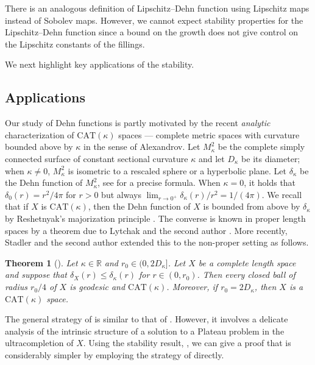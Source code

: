 \documentclass[a4paper,leqno]{amsart}
\numberwithin{equation}{section}
\newtheorem{theorem}{Theorem}[section]
\theoremstyle{remark}
\theoremstyle{remark}
\begin{document}
There is an analogous definition of Lipschitz--Dehn function using Lipschitz maps instead of Sobolev maps. However, we cannot expect stability properties for the Lipschitz--Dehn function since a bound on the growth does not give control on the Lipschitz constants of the fillings.%

We next highlight key applications of the stability.




\subsection{Applications}
Our study of Dehn functions is partly motivated by the recent \emph{analytic} characterization of $\mathrm{CAT}(\kappa)$ spaces --- complete metric spaces with curvature bounded above by $\kappa$ in the sense of Alexandrov. Let $M^{2}_\kappa$ be the complete simply connected surface of constant sectional curvature $\kappa$ and let $D_\kappa$ be its diameter; when $\kappa \neq 0$, $M^{2}_\kappa$ is isometric to a rescaled sphere or a hyperbolic plane. Let $\delta_\kappa$ be the Dehn function of $M^{2}_\kappa$, see \cite[Section 4.1]{stadler-wenger-2025-isoperimetric-inequalities-vs-upper-curvature-bounds} for a precise formula. When $\kappa = 0$, it holds that $\delta_{0}(r) = r^2/4\pi$ for $r > 0$ but always $\lim_{ r \to 0^{+} }\delta_{\kappa}(r)/r^2 = 1/(4\pi)$. We recall that if $X$ is $\mathrm{CAT}(\kappa)$, then the Dehn function of $X$ is bounded from above by $\delta_\kappa$ by Reshetnyak's majorization principle \cite{reshetnyak-1968-non-expansive-maps-in-a-space-of-curvature-no-greater-than-K}. The converse is known in proper length spaces by a theorem due to Lytchak and the second author \cite{Lyt:Wen:18:CAT}. More recently, Stadler and the second author \cite{stadler-wenger-2025-isoperimetric-inequalities-vs-upper-curvature-bounds} extended this to the non-proper setting as follows.
\begin{theorem}[{\cite[Theorem A]{stadler-wenger-2025-isoperimetric-inequalities-vs-upper-curvature-bounds}}]\label{theorem-local-cat(kappa)}
Let $\kappa \in \mathbb{R}$ and $r_0 \in (0, 2D_\kappa]$. Let $X$ be a complete length space and suppose that $\delta_{X}(r) \leq \delta_{\kappa}(r)$ for $r \in (0,r_0)$. Then every closed ball of radius $r_0/4$ of $X$ is geodesic and $\mathrm{CAT}(\kappa)$. Moreover, if $r_0 = 2D_\kappa$, then $X$ is a $\mathrm{CAT}(\kappa)$ space.
\end{theorem}
    The general strategy of \cite{stadler-wenger-2025-isoperimetric-inequalities-vs-upper-curvature-bounds} is similar to that of \cite{Lyt:Wen:18:CAT}. However, it involves a delicate analysis of the intrinsic structure of a solution to a Plateau problem in the ultracompletion of $X$. Using the stability result, , we can give a proof that is considerably simpler by employing the strategy  of \cite{Lyt:Wen:18:CAT} directly.
\end{document}
